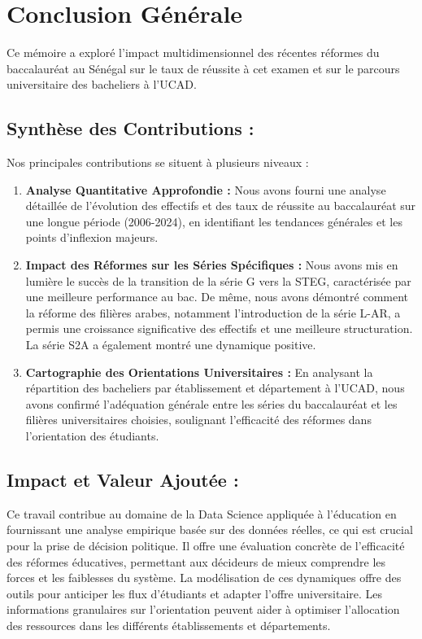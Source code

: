 \chapter*{Conclusion Générale}

Ce mémoire a exploré l'impact multidimensionnel des récentes réformes du baccalauréat au Sénégal sur le taux de réussite à cet examen et sur le parcours universitaire des bacheliers à l'UCAD.

\section*{Synthèse des Contributions :}

Nos principales contributions se situent à plusieurs niveaux :
\begin{enumerate}
    \item \textbf{Analyse Quantitative Approfondie :} Nous avons fourni une analyse détaillée de l'évolution des effectifs et des taux de réussite au baccalauréat sur une longue période (2006-2024), en identifiant les tendances générales et les points d'inflexion majeurs.
    \item \textbf{Impact des Réformes sur les Séries Spécifiques :} Nous avons mis en lumière le succès de la transition de la série G vers la STEG, caractérisée par une meilleure performance au bac. De même, nous avons démontré comment la réforme des filières arabes, notamment l'introduction de la série L-AR, a permis une croissance significative des effectifs et une meilleure structuration. La série S2A a également montré une dynamique positive.
    \item \textbf{Cartographie des Orientations Universitaires :} En analysant la répartition des bacheliers par établissement et département à l'UCAD, nous avons confirmé l'adéquation générale entre les séries du baccalauréat et les filières universitaires choisies, soulignant l'efficacité des réformes dans l'orientation des étudiants.
\end{enumerate}

\section*{Impact et Valeur Ajoutée :}

Ce travail contribue au domaine de la Data Science appliquée à l'éducation en fournissant une analyse empirique basée sur des données réelles, ce qui est crucial pour la prise de décision politique. 
Il offre une évaluation concrète de l'efficacité des réformes éducatives, permettant aux décideurs de mieux comprendre les forces et les faiblesses du système. 
La modélisation de ces dynamiques offre des outils pour anticiper les flux d'étudiants et adapter l'offre universitaire. 
Les informations granulaires sur l'orientation peuvent aider à optimiser l'allocation des ressources dans les différents établissements et départements.

